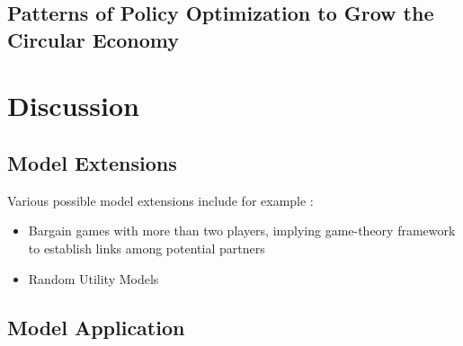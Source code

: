 \documentclass[fleqn,10pt]{wlscirep}
\begin{document}
{

\subsection*{Patterns of Policy Optimization to Grow the Circular Economy}








\section*{Discussion}




\subsection*{Model Extensions}

Various possible model extensions include for example :
\begin{itemize}
\item Bargain games with more than two players, implying game-theory framework to establish links among potential partners
\item Random Utility Models
\end{itemize}




\subsection*{Model Application}









}
\end{document}
